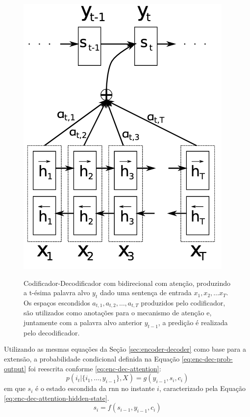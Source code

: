 \begin{figure}[htbp]
    \centering
        \caption[Codificador-Decodificador utilizando  bidirecional com mecanismos de atenção.]{Codificador-Decodificador com  bidirecional com atenção, produzindo a t-ésima palavra alvo $y_t$ dado uma sentença de entrada $x_1, x_2, \dots x_T$. Os espaços escondidos $a_{t,1}, a_{t,2}, \dots, a_{t,T}$ produzidos pelo codificador, são utilizados como anotações para o mecanismo de atenção e, juntamente com a palavra alvo anterior $y_{t-1}$, a predição é realizada pelo decodificador.}
        \includegraphics[scale=0.85]{resources/images/pln/rnn-attention.png}
        \label{fig:rnn-attention}
\end{figure}

Utilizando as mesmas equações da Seção \ref{sec:encoder-decoder} como base para a extensão, a probabilidade condicional definida na Equação \ref{eq:enc-dec-prob-output} foi reescrita conforme \ref{eq:enc-dec-attention}:
\begin{equation}
    \label{eq:enc-dec-attention}
    p(i_t | \{ i_1, \dots, y_{i-1} \}, X) = g(y_{i-1}, s_i, c_i)
\end{equation}
em que $s_i$ é o estado escondida da \gls{rnn} no instante $i$, caracterizado pela Equação \ref{eq:enc-dec-attention-hidden-state}.
\begin{equation}
    \label{eq:enc-dec-attention-hidden-state}
    s_i = f(s_{i-1}, y_{i-1}, c_i)
\end{equation}

